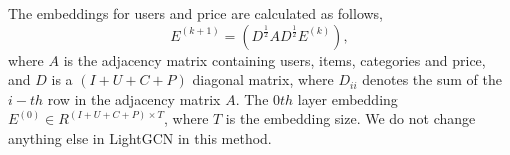 The embeddings for users and price are calculated as follows,
\begin{equation}
    E^{(k+1)} = (D^{\frac{1}{2}}AD^{\frac{1}{2}}E^{(k)}),
\end{equation}
where $A$ is the adjacency matrix containing users, items, categories and price, and $D$ is a $(I + U + C + P)$ diagonal matrix, where $D_{ii}$ denotes the sum of the $i-th$ row in the adjacency matrix $A$. 
The $0th$ layer embedding $E^{(0)} \in R^{(I + U + C + P)\times T}$, where $T$ is the embedding size.
We do not change anything else in LightGCN in this method.

